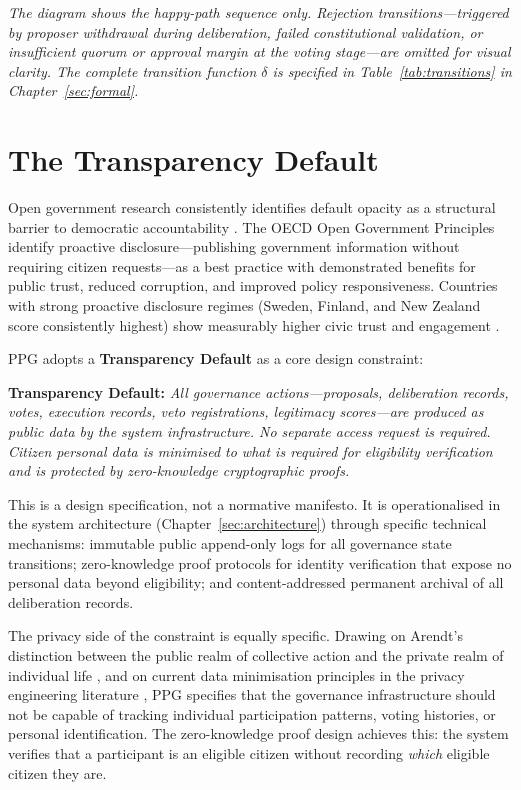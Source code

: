 \documentclass[12pt,a4paper,oneside]{report}
\begin{document}
\noindent\textit{\small The diagram shows the happy-path sequence only. Rejection transitions---triggered by proposer withdrawal during deliberation, failed constitutional validation, or insufficient quorum or approval margin at the voting stage---are omitted for visual clarity. The complete transition function $\delta$ is specified in Table~\ref{tab:transitions} in Chapter~\ref{sec:formal}.}

\section{The Transparency Default}
\label{sec:inversion}

Open government research consistently identifies default opacity as a structural barrier to democratic accountability \citep{oecd2020open}. The OECD Open Government Principles identify proactive disclosure---publishing government information without requiring citizen requests---as a best practice with demonstrated benefits for public trust, reduced corruption, and improved policy responsiveness. Countries with strong proactive disclosure regimes (Sweden, Finland, and New Zealand score consistently highest) show measurably higher civic trust and engagement \citep{oecd2020open}.

PPG adopts a \textbf{Transparency Default} as a core design constraint:

\begin{mdframed}
\textbf{Transparency Default:} \textit{All governance actions---proposals, deliberation records, votes, execution records, veto registrations, legitimacy scores---are produced as public data by the system infrastructure. No separate access request is required. Citizen personal data is minimised to what is required for eligibility verification and is protected by zero-knowledge cryptographic proofs.}
\end{mdframed}

This is a design specification, not a normative manifesto. It is operationalised in the system architecture (Chapter~\ref{sec:architecture}) through specific technical mechanisms: immutable public append-only logs for all governance state transitions; zero-knowledge proof protocols for identity verification that expose no personal data beyond eligibility; and content-addressed permanent archival of all deliberation records.

The privacy side of the constraint is equally specific. Drawing on Arendt's distinction between the public realm of collective action and the private realm of individual life \citep{arendt1958human}, and on current data minimisation principles in the privacy engineering literature \citep{boneh2020graduate}, PPG specifies that the governance infrastructure should not be capable of tracking individual participation patterns, voting histories, or personal identification. The zero-knowledge proof design achieves this: the system verifies that a participant is an eligible citizen without recording \emph{which} eligible citizen they are.
\end{document}
